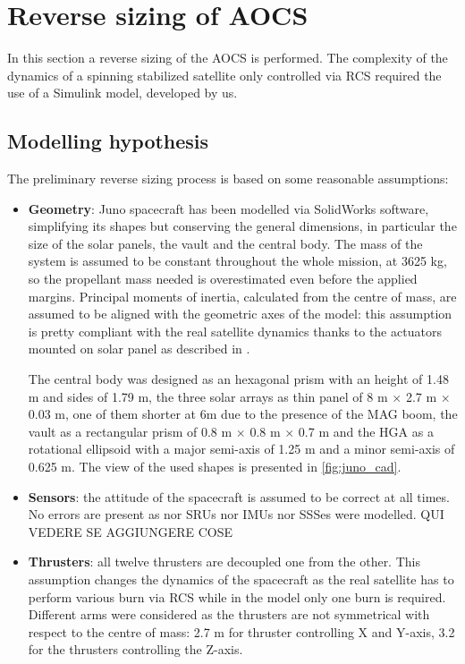 \section{Reverse sizing of AOCS}
\label{sec:AOCS_sizing}

In this section a reverse sizing of the AOCS is performed. The complexity of the dynamics of a spinning stabilized satellite only controlled via RCS required the use of a Simulink model, developed by us. 

\subsection{Modelling hypothesis}
\label{subsec: mod_hypo}
The preliminary reverse sizing process is based on some reasonable assumptions:

\begin{itemize}
    \item \textbf{Geometry}: Juno spacecraft has been modelled via SolidWorks software, simplifying its shapes but conserving the general dimensions, in particular the size of the solar panels, the vault and the central body. The mass of the system is assumed to be constant throughout the whole mission, at 3625 kg, so the propellant mass needed is overestimated even before the applied margins.     
    Principal moments of inertia, calculated from the centre of mass, are assumed to be aligned with the geometric axes of the model: this assumption is pretty compliant with the real satellite dynamics thanks to the actuators mounted on solar panel as described in \mref. 
       
    The central body was designed as an hexagonal prism with an height of 1.48 m and sides of 1.79 m, the three solar arrays as thin panel of 8 m $\times$ 2.7 m $\times$ 0.03 m, one of them shorter at 6m due to the presence of the MAG boom, the vault as a rectangular prism of 0.8 m $\times$ 0.8 m $\times$ 0.7 m and the HGA as a rotational ellipsoid with a major semi-axis of 1.25 m and a minor semi-axis of 0.625 m. 
    The view of the used shapes is presented in \autoref{fig:juno_cad}.

    \item \textbf{Sensors}: the attitude of the spacecraft is assumed to be correct at all times. No errors are present as nor SRUs nor IMUs nor SSSes were modelled. QUI VEDERE SE AGGIUNGERE COSE
    
    \item \textbf{Thrusters}: all twelve thrusters are decoupled one from the other. This assumption changes the  dynamics of the spacecraft as the real satellite has to perform various burn via RCS while in the model only one burn is required. %
    Different arms were considered as the thrusters are not symmetrical with respect to the centre of mass: 2.7 m for thruster controlling X and Y-axis, 3.2 for the thrusters controlling the Z-axis.


\end{itemize}
